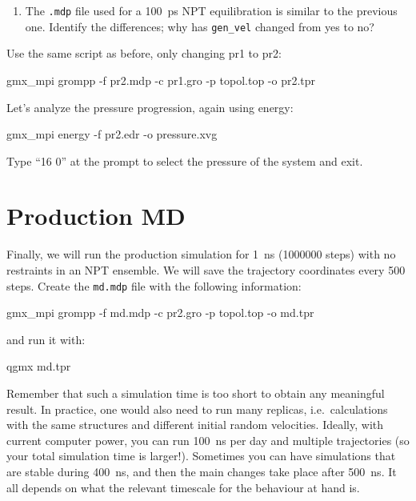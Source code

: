 \documentclass[10pt]{article}
\begin{document}
\begin{summary}
    \begin{enumerate}[leftmargin=0.6cm]
        \renewcommand{\labelenumi}{Q\arabic{enumi}.}
        \setcounter{enumi}{8}
        \item The \texttt{.mdp} file used for a 100~ps NPT equilibration is similar to the previous one. Identify the differences; why has \texttt{gen\_vel} changed from yes to no?
    \end{enumerate}
\end{summary}

Use the same script as before, only changing pr1 to pr2:

\begin{cmdline}
gmx_mpi grompp -f pr2.mdp -c pr1.gro -p topol.top -o pr2.tpr
\end{cmdline}

Let's analyze the pressure progression, again using energy:
\begin{cmdline}
gmx_mpi energy -f pr2.edr -o pressure.xvg
\end{cmdline}

Type ``16 0'' at the prompt to select the pressure of the system and exit. 


\section{Production MD}
Finally,  we will run the production simulation for 1~ns (1000000 steps) with no restraints in an NPT ensemble. We will save the trajectory coordinates every 500 steps. Create the \texttt{md.mdp} file with the following information:
 
\begin{cmdline}
gmx_mpi grompp -f md.mdp -c pr2.gro -p topol.top -o md.tpr
\end{cmdline}

and run it with:

\begin{cmdline}
qgmx md.tpr
\end{cmdline}

Remember that such a simulation time is too short to obtain any meaningful result. In practice, one would also need to run many replicas, i.e.\ calculations with the same structures and different initial random velocities. Ideally, with current computer power, you can run 100~ns per day and multiple trajectories (so your total simulation time is larger!). Sometimes you can have simulations that are stable during 400~ns, and then the main changes take place after 500~ns. It all depends on what the relevant timescale for the behaviour at hand is.
\end{document}
